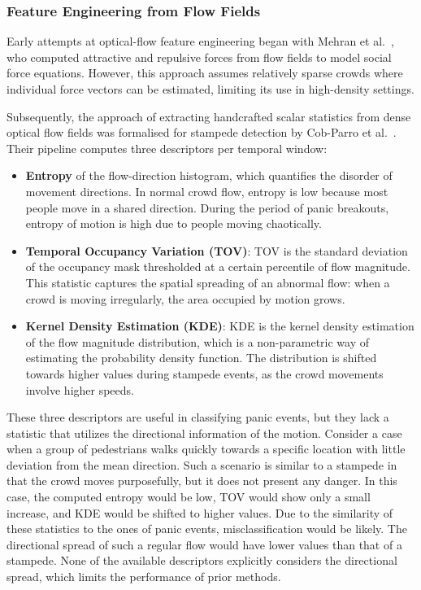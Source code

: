 \subsubsection{Feature Engineering from Flow Fields}
Early attempts at optical-flow feature engineering began with Mehran et al.\ \cite{mehran2009abnormal}, who computed attractive and repulsive forces from flow fields to model social force equations. However, this approach assumes relatively sparse crowds where individual force vectors can be estimated, limiting its use in high-density settings. 

Subsequently, the approach of extracting handcrafted scalar statistics from dense optical flow fields was formalised for stampede detection by Cob-Parro et al.\ \cite{cobparro2021stampede}. Their pipeline computes three descriptors per temporal window:
\begin{itemize}
  \item \textbf{Entropy} of the flow-direction histogram, which quantifies the disorder of movement directions. In normal crowd flow, entropy is low because most people move in a shared direction. During the period of panic breakouts, entropy of motion is high due to people moving chaotically.
  \item \textbf{Temporal Occupancy Variation (TOV)}: TOV is the standard deviation of the occupancy mask thresholded at a certain percentile of flow magnitude. This statistic captures the spatial spreading of an abnormal flow: when a crowd is moving irregularly, the area occupied by motion grows.
  \item \textbf{Kernel Density Estimation (KDE)}: KDE is the kernel density estimation of the flow magnitude distribution, which is a non-parametric way of estimating the probability density function. The distribution is shifted towards higher values during stampede events, as the crowd movements involve higher speeds.
\end{itemize}

These three descriptors are useful in classifying panic events, but they lack a statistic that utilizes the directional information of the motion. Consider a case when a group of pedestrians walks quickly towards a specific location with little deviation from the mean direction. Such a scenario is similar to a stampede in that the crowd moves purposefully, but it does not present any danger. In this case, the computed entropy would be low, TOV would show only a small increase, and KDE would be shifted to higher values. Due to the similarity of these statistics to the ones of panic events, misclassification would be likely. The directional spread of such a regular flow would have lower values than that of a stampede. None of the available descriptors explicitly considers the directional spread, which limits the performance of prior methods.

